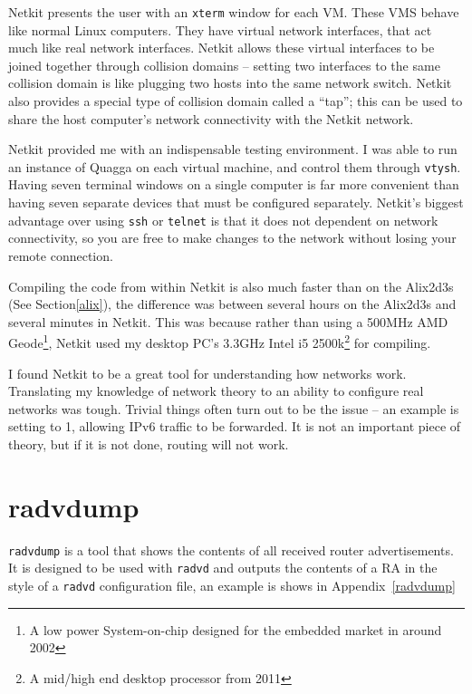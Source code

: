 \documentclass[12pt,a4paper,twoside]{report}
\begin{document}
Netkit presents the user with an \texttt{xterm} window for each VM\@. These VMS
behave like normal Linux computers. They have virtual network interfaces, that
act much like real network interfaces. Netkit allows these virtual interfaces
to be joined together through collision domains -- setting two interfaces to
the same collision domain is like plugging two hosts into the same network
switch.  Netkit also provides a special type of collision domain called a
``tap''; this can be used to share the host computer's network connectivity
with the Netkit network.

Netkit provided me with an indispensable testing environment. I was able to run
an instance of Quagga on each virtual machine, and control them through
\texttt{vtysh}. Having seven terminal windows on a single computer is far more
convenient than having seven separate devices that must be configured
separately. Netkit's biggest advantage over using \texttt{ssh} or
\texttt{telnet} is that it does not  dependent on network connectivity, so you
are free to make changes to the network without losing your remote connection.

Compiling the code from within Netkit is also much faster than on the Alix2d3s
(See Section\ref{alix}), the difference was between several hours on the
Alix2d3s and several minutes in Netkit. This was because rather than using a
500MHz AMD Geode\footnote{A low power System-on-chip designed for the embedded
market in around 2002}, Netkit used my desktop PC's 3.3GHz Intel i5
2500k\footnote{A mid/high end desktop processor from 2011} for compiling. 

I found Netkit to be a great tool for understanding how networks work.
Translating my knowledge of network theory to an ability to configure real
networks was tough. Trivial things often turn out to be the issue -- an example
is setting  to 1, allowing IPv6
traffic to be forwarded. It is not an important piece of theory, but if it is
not done, routing will not work. 

\section{radvdump}
\texttt{radvdump} is a tool that shows the contents of all received router
advertisements. It is designed to be used with \texttt{radvd} and outputs the
contents of a RA in the style of a \texttt{radvd} configuration file, an
example is shows in Appendix~\ref{radvdump} 
\end{document}
